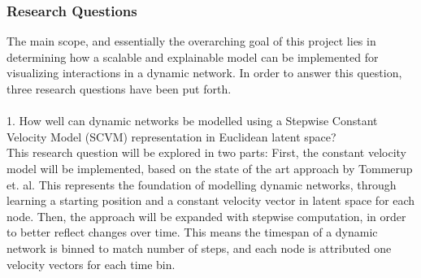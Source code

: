 \subsubsection{Research Questions} 
\label{sec:Intro:ResearchQs}
The main scope, and essentially the overarching goal of this project lies in determining how a scalable and explainable model can be implemented for visualizing interactions in a dynamic network.
In order to answer this question, three research questions have been put forth.
\\\\
1. How well can dynamic networks be modelled using a Stepwise Constant Velocity Model (SCVM) representation in Euclidean latent space?
\\
This research question will be explored in two parts:
First, the constant velocity model will be implemented, based on the state of the art approach by Tommerup et. al. \cite{Tommerup2021LearningNetworks}
This represents the foundation of modelling dynamic networks, through learning a starting position and a constant velocity vector in latent space for each node.
Then, the approach will be expanded with stepwise computation, in order to better reflect changes over time.
This means the timespan of a dynamic network is binned to match number of steps, and each node is attributed one velocity vectors for each time bin.

